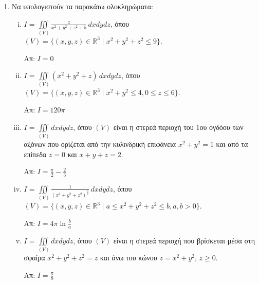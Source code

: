 


\everymath{\displaystyle}





\thispagestyle{empty}

\begin{center}
\end{center}

\vspace{\baselineskip}

\begin{enumerate}
  \item Να υπολογιστούν τα παρακάτω ολοκληρώματα:
  \begin{enumerate}[i)]
    \item $I=\iiint\limits_{(V)}\frac{z}{x^{2}+y^{2}+z^{2}+5}\,dxdydz$, όπου $(V)=\{(x,y,z)\in \mathbb{R}^{3} \mid x^{2}+y^{2}+z^{2}\leq 9\}$.

    \hfill Απ: $I=0$

    \item $I=\iiint\limits_{(V)}(x^{2}+y^{2}+z)\,dxdydz$, όπου $(V)=\{(x,y,z)\in \mathbb{R}^{3} \mid x^{2}+y^{2}\leq 4, 0\leq z\leq 6\}$.

    \hfill Απ: $I=120\pi$

    \item $I=\iiint\limits_{(V)}dxdydz$, όπου $(V)$ είναι η στερεά περιοχή του $1$ου ογδόου των αξόνων που ορίζεται από την κυλινδρική επιφάνεια $x^{2}+y^{2}=1$ και από τα επίπεδα $z=0$ και $x+y+z=2$.

    \hfill Απ: $I=\frac{\pi}{2}-\frac{2}{3}$

    \item $I=\iiint\limits_{(V)}\frac{1}{(x^{2}+y^{2}+z^{2})^{\frac{3}{2}}}\,dxdydz$, όπου $(V)=\{(x,y,z)\in \mathbb{R}^{3} \mid a\leq x^{2}+y^{2}+z^{2}\leq b, a,b>0 \}$.

    \hfill Απ: $I=4\pi \ln \frac{b}{a}$

    \item $I=\iiint\limits_{(V)}dxdydz$, όπου $(V)$ είναι η στερεά περιοχή που βρίσκεται μέσα στη σφαίρα $x^{2}+y^{2}+z^{2}=z$ και άνω του κώνου $z=x^{2}+y^{2}$, $z\geq 0$.

    \hfill Απ: $I=\frac{\pi}{8}$
  \end{enumerate}
\end{enumerate}





